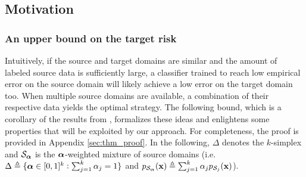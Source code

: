 \subsection{Motivation}
\label{sec:moda_motivation}
\subsubsection{An upper bound on the target risk}

Intuitively, if the source and target domains are similar and the amount of labeled source data is sufficiently large, a classifier trained to reach low empirical error on the source domain will likely achieve a low error on the target domain too. When multiple source domains are available, a combination of their respective data yields the optimal strategy. The following bound, which is a corollary of the results from \citet{BenDavid2010}, formalizes these ideas and enlightens some properties that will be exploited by our approach. For completeness, the proof is provided in Appendix \ref{sec:thm_proof}. In the following, $\Delta$ denotes the $k$-simplex and ${\mathcal{S}}_{{\bm{\alpha}}}$ is the ${\bm{\alpha}}$-weighted mixture of source domains (i.e.\ $\Delta \triangleq \lbrace {\bm{\alpha}} \in [0,1]^k: \sum_{j=1}^{k} \alpha_j = 1 \rbrace$ and  $p_{{\mathcal{S}}_{{\bm{\alpha}}}}({\mathbf{x}}) \triangleq \sum_{j=1}^{k} {\alpha}_j p_{{\mathcal{S}}_j}({\mathbf{x}})$).

